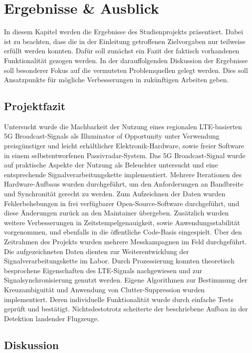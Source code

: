 \chapter{Ergebnisse \& Ausblick}

In diesem Kapitel werden die Ergebnisse des Studienprojekts präsentiert. Dabei ist zu beachten, dass die in der Einleitung getroffenen Zielvorgaben nur teilweise erfüllt werden konnten. Dafür soll zunächst ein Fazit der faktisch vorhandenen Funktionalität gezogen werden. In der darauffolgenden Diskussion der Ergebnisse soll besonderer Fokus auf die vermuteten Problemquellen gelegt werden. Dies soll Ansatzpunkte für mögliche Verbesserungen in zukünftigen Arbeiten geben.

\section{Projektfazit}

Untersucht wurde die Machbarkeit der Nutzung eines regionalen LTE-basierten 5G Broadcast-Signals als Illuminator of Opportunity unter Verwendung preisgünstiger und leicht erhältlicher Elektronik-Hardware, sowie freier Software in einem selbstentworfenen Passivradar-System. Das 5G Broadcast-Signal wurde auf praktische Aspekte der Nutzung als Beleuchter untersucht und eine entsprechende Signalverarbeitungskette implementiert. Mehrere Iterationen des Hardware-Aufbaus wurden durchgeführt, um den Anforderungen an Bandbreite und Synchronität gerecht zu werden. Zum Aufzeichnen der Daten wurden Fehlerbehebungen in frei verfügbarer Open-Source-Software durchgeführt, und diese Änderungen zurück an den Maintainer übergeben. Zusätzlich wurden weitere Verbesserungen in Zeitstempelgenauigkeit, sowie Anwendungsstabilität vorgenommen, und ebenfalls in die öffentliche Code-Basis eingespielt. Über den Zeitrahmen des Projekts wurden mehrere Messkampagnen im Feld durchgeführt. Die aufgezeichneten Daten dienten zur Weiterentwicklung der Signalverarbeitungskette im Labor. Durch Prozessierung konnten theoretisch besprochene Eigenschaften des LTE-Signals nachgewiesen und zur Signalsynchronisierung genutzt werden. Eigene Algorithmen zur Bestimmung der Kreuzambiguität und Anwendung von Clutter-Suppression wurden implementiert. Deren individuelle Funktionalität wurde durch einfache Tests geprüft und bestätigt. Nichtsdestotrotz scheiterte der beschriebene Aufbau in der Detektion landender Flugzeuge.

\section{Diskussion}

